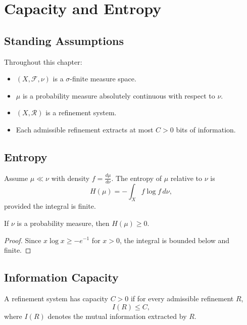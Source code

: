 \chapter{Capacity and Entropy}

\section*{Standing Assumptions}

Throughout this chapter:

\begin{itemize}
\item $(X,\mathcal{F},\nu)$ is a $\sigma$-finite measure space.
\item $\mu$ is a probability measure absolutely continuous with respect to $\nu$.
\item $(X,\mathcal{R})$ is a refinement system.
\item Each admissible refinement extracts at most $C>0$ bits of information.
\end{itemize}

\section{Entropy}

\begin{definition}
Assume $\mu \ll \nu$ with density $f = \frac{d\mu}{d\nu}$.  
The entropy of $\mu$ relative to $\nu$ is
\[
H(\mu) = - \int_X f \log f \, d\nu,
\]
provided the integral is finite.
\end{definition}

\begin{lemma}[Nonnegativity]
If $\nu$ is a probability measure, then $H(\mu) \ge 0$.
\end{lemma}

\begin{proof}
Since $x\log x \ge -e^{-1}$ for $x>0$, the integral is bounded below and finite.
\end{proof}

\section{Information Capacity}

\begin{definition}
A refinement system has capacity $C>0$ if for every admissible refinement $R$,
\[
I(R) \le C,
\]
where $I(R)$ denotes the mutual information extracted by $R$.
\end{definition}


